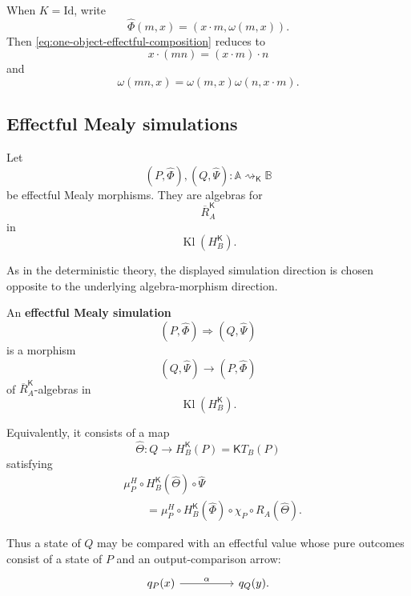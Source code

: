 When \(K=\mathrm{Id}\), write
\[
    \widehat\Phi(m,x)
    =
    (x\cdot m,\omega(m,x)).
\]
Then
\eqref{eq:one-object-effectful-composition} reduces to
\[
    x\cdot(mn)
    =
    (x\cdot m)\cdot n
\]
and
\[
    \omega(mn,x)
    =
    \omega(m,x)\omega(n,x\cdot m).
\]

\subsection{Effectful Mealy simulations}
\label{subsec:effectful-mealy-simulations}

Let
\[
    (P,\widehat\Phi),
    (Q,\widehat\Psi):
    \mathbb A\rightsquigarrow_{\mathsf K}\mathbb B
\]
be effectful Mealy morphisms. They are algebras for
\[
    \overline R_A^{\mathsf K}
\]
in
\[
    \operatorname{Kl}(H_B^{\mathsf K}).
\]

As in the deterministic theory, the displayed simulation direction is chosen
opposite to the underlying algebra-morphism direction.

\begin{definition}
\label{def:effectful-mealy-simulation}
    An \textbf{effectful Mealy simulation}
    \[
        (P,\widehat\Phi)
        \Rightarrow
        (Q,\widehat\Psi)
    \]
    is a morphism
    \[
        (Q,\widehat\Psi)
        \longrightarrow
        (P,\widehat\Phi)
    \]
    of \(\overline R_A^{\mathsf K}\)-algebras in
    \[
        \operatorname{Kl}(H_B^{\mathsf K}).
    \]

    Equivalently, it consists of a map
    \[
        \widehat\Theta:
        Q
        \longrightarrow
        H_B^{\mathsf K}(P)
        =
        \mathsf K T_B(P)
    \]
    satisfying
    \begin{equation}
    \begin{aligned}
        &
        \mu^H_P
        \circ
        H_B^{\mathsf K}(\widehat\Theta)
        \circ
        \widehat\Psi
        \\
        &\qquad=
        \mu^H_P
        \circ
        H_B^{\mathsf K}(\widehat\Phi)
        \circ
        \chi_P
        \circ
        R_A(\widehat\Theta).
    \end{aligned}
    \label{eq:effectful-simulation-abstract}
    \end{equation}
\end{definition}

Thus a state of \(Q\) may be compared with an effectful value whose pure
outcomes consist of a state of \(P\) and an output-comparison arrow:
\[
    \begin{tikzcd}[column sep=huge]
            q_P(x)
                \arrow[r, "\alpha"]
        &
            q_Q(y).
    \end{tikzcd}
\]

